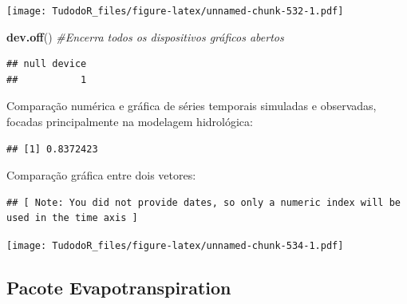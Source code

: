 \documentclass[
]{book}
\newenvironment{Shaded}{\begin{snugshade}}{\end{snugshade}}
\newcommand{\CommentTok}[1]{\textcolor[rgb]{0.56,0.35,0.01}{\textit{#1}}}
\newcommand{\DataTypeTok}[1]{\textcolor[rgb]{0.13,0.29,0.53}{#1}}
\newcommand{\KeywordTok}[1]{\textcolor[rgb]{0.13,0.29,0.53}{\textbf{#1}}}
\newcommand{\NormalTok}[1]{#1}
\newcommand{\OperatorTok}[1]{\textcolor[rgb]{0.81,0.36,0.00}{\textbf{#1}}}
\begin{document}
\texttt{[image: TudodoR\_files/figure-latex/unnamed-chunk-532-1.pdf]}

\begin{Shaded}
\begin{Highlighting}[]
\KeywordTok{dev.off}\NormalTok{() }\CommentTok{#Encerra todos os dispositivos gráficos abertos}
\end{Highlighting}
\end{Shaded}

\begin{verbatim}
## null device 
##           1
\end{verbatim}

Comparação numérica e gráfica de séries temporais simuladas e observadas, focadas principalmente na modelagem hidrológica:

\begin{Shaded}
\end{Shaded}

\begin{verbatim}
## [1] 0.8372423
\end{verbatim}

Comparação gráfica entre dois vetores:

\begin{Shaded}
\end{Shaded}

\begin{verbatim}
## [ Note: You did not provide dates, so only a numeric index will be used in the time axis ]
\end{verbatim}

\texttt{[image: TudodoR\_files/figure-latex/unnamed-chunk-534-1.pdf]}

\hypertarget{pacote-evapotranspiration}{%
\subsection{Pacote Evapotranspiration}\label{pacote-evapotranspiration}}
\end{document}
